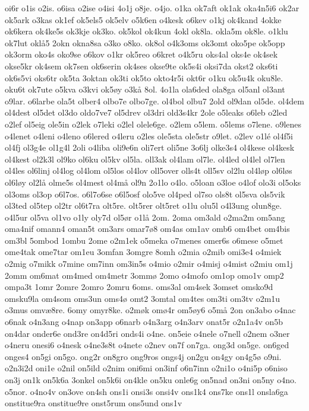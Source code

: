 {oi6r
o1is
o2is.
o6isa
o2ise
o4isi
4o1j
o8je.
o4jo.
o1ka
ok7aft
ok1ak
oka4n5i6
ok2ar
ok5ark
o3kas
ok1ef
ok5els5
ok5elv
o5k6en
o4kesk
o6kev
o1kj
ok4kand
4okke
ok6kera
ok4ke5s
ok3kje
ok3ko.
ok5kol
ok4kun
4okl
ok8la.
okla5m
ok8le.
o1klu
ok7lut
oklå5
2okn
okna8sa
o3ko
o8ko.
ok8ol
o4k3oms
ok3omt
oko5pe
ok5opp
ok3orm
oko4s
oko9se
o6kov
o1kr
ok5reo
o6kret
o4k5ru
oks4al
oks4e
ok4sek
okse5kr
ok4sem
ok7sen
ok6serin
ok4ses
okse9te
ok5s4i
oksi7da
okst2
oks6ti
ok6s5vi
oks6tr
ok5ta
3oktan
ok3ti
ok5to
okto4r5i
okt6r
o1ku
ok5u4k
oku8le.
oku6t
ok7ute
o5kva
o3kvi
ok5øy
o3kå
8ol.
4o1la
ola6ded
ola8ga
ol5anl
ol3ant
o9lar.
o6larbe
ola5t
olber4
olbo7e
olbo7ge.
ol4bol
olbu7
2old
ol9dan
ol5de.
ol4dem
ol4dest
ol5det
ol3do
oldo7ve7
ol5drev
ol3dri
old3s4kr
2ole
o5leaks
o6leb
o2led
o2lef
ol5eig
ole5in
o2lek
o7leki
o2lel
olele6ge.
o2lem
o5lem.
o5lems
o7lene.
o9lenes
o4lenet
o4leni
o4leno
o6lered
o4leru
o2les
ole5sta
ole5str
o9let.
o2lev
o1lé
ol4f5i
ol4fj
ol3g4e
ol1g4l
2oli
o4liba
oli9e6n
oli7ert
oli5ne
3o6lj
olke3s4
ol4kese
ol4kesk
ol4kest
ol2k3l
ol9ko
ol6ku
ol5kv
ol5la.
oll3ak
ol4lam
ol7le.
ol4led
ol4lel
ol7len
ol4les
ol6linj
ol4log
ol4lom
ol5los
ol4lov
oll5over
olls4t
oll5sv
ol2lu
ol4løp
ol6løs
ol6løy
ol2lå
olme5s
ol4mest
ol4må
ol9n
2o1lo
o4lo.
o5loan
o3loe
o4lof
olo3i
ol5oks
ol3oms
ol3op
o6l7os.
o6l7o6se
o6l5osf
olo5ve
ol4ped
ol7so
ols8t
ol5sva
ols5vik
ol3ted
ol5tep
ol2tr
ol6t7ra
olt5re.
olt5rer
olt5ret
o1lu
olu5l
o4l3ung
olun8ge.
o4l5ur
ol5va
ol1vo
o1ly
oly7d
ol5ør
o1lå
2om.
2oma
om3ald
o2ma2m
om5ang
oma4nif
omann4
oman5t
om3ars
omar7ø8
om4as
om1av
omb6
om4bet
om4bis
om3bl
5ombod
1ombu
2ome
o2m1ek
o5meka
o7menes
omer6s
o6mese
o5met
ome4tak
ome7tar
om1eu
3omfan
3omgre
8omh
o2mia
o2mib
omi3e4
o4miek
o2mig
o7mikk
o7mine
om7inn
om3in5s
o4mio
o2mir
o4misj
o4mist
o2miu
om1j
2omm
om6mat
om4med
om4metr
3ommø
2omo
o4mofo
om1op
omo1v
omp2
ompa3t
1omr
2omre
2omro
2omru
6oms.
oms3al
om4sek
3omset
omsko9d
omsku9la
om4som
oms3un
oms4ø
omt2
3omtal
om4tes
om3ti
om3tv
o2m1u
o3mus
omvæ8re.
6omy
omyr8ke.
o2møk
omø4r
om5øy6
o5må
2on
on3abo
o4nac
o6nak
o4n3ang
o4nap
on3app
o6narb
o4n3arg
o4n3arv
onat5r
o2n1a4v
on5b
on4dar
onder6e
ond3re
on4d5ri
onds4i
o4ne.
on5eie
o4nele
o7nell
o2nem
o3ner
o4neru
onesi6
o4nesk
o4ne3s8t
o4nete
o2nev
on7f
on7ga.
ong3d
on5ge.
on6ged
onges4
on5gi
on5go.
ong2r
on8gro
ong9ros
ongs4j
on2gu
on4gy
on4g5ø
o9ni.
o2n3i2d
oni1e
o2nil
on5ild
o2nim
oni6mi
on3inf
o6n7inn
o2ni1o
o4ni5p
o6niso
on3j
on1k
on5k6a
3onkel
on5k6i
on4kle
on5ku
onle6g
on5nad
on3ni
on5ny
o4no.
o5nor.
o4no4v
on3ove
on4sh
ons1i
onsi3s
onsi4v
ons1k4
ons7ke
ons1l
onsla6ga
onstitue9ra
onstitue9re
onst5rum
ons5und
ons1v
}
